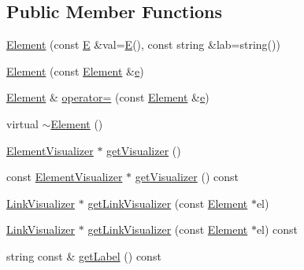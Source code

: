 \subsection*{Public Member Functions}
\begin{DoxyCompactItemize}
\item 
\mbox{\hyperlink{classbridges_1_1_element_abc7131584142ea48faf3b7a8033d1fef}{Element}} (const \mbox{\hyperlink{namespacebridges_acfb0a4f7877d8f63de3e6862004c50eda3a3ea00cfc35332cedf6e5e9a32e94da}{E}} \&val=\mbox{\hyperlink{namespacebridges_acfb0a4f7877d8f63de3e6862004c50eda3a3ea00cfc35332cedf6e5e9a32e94da}{E}}(), const string \&lab=string())
\item 
\mbox{\hyperlink{classbridges_1_1_element_a6dc69b51f85f4e9914434b8c79126057}{Element}} (const \mbox{\hyperlink{classbridges_1_1_element}{Element}} \&\mbox{\hyperlink{namespacebridges_acfb0a4f7877d8f63de3e6862004c50edae1671797c52e15f763380b45e841ec32}{e}})
\item 
\mbox{\hyperlink{classbridges_1_1_element}{Element}} \& \mbox{\hyperlink{classbridges_1_1_element_a0f1b5a5688fe4db68f84969e93cea245}{operator=}} (const \mbox{\hyperlink{classbridges_1_1_element}{Element}} \&\mbox{\hyperlink{namespacebridges_acfb0a4f7877d8f63de3e6862004c50edae1671797c52e15f763380b45e841ec32}{e}})
\item 
virtual \mbox{\hyperlink{classbridges_1_1_element_a1dcdcd8948db683fc109687fe5d9c8e1}{$\sim$\+Element}} ()
\item 
\mbox{\hyperlink{classbridges_1_1_element_visualizer}{Element\+Visualizer}} $\ast$ \mbox{\hyperlink{classbridges_1_1_element_a358f350ae6e33d55c4ac9f9213d0c5bc}{get\+Visualizer}} ()
\item 
const \mbox{\hyperlink{classbridges_1_1_element_visualizer}{Element\+Visualizer}} $\ast$ \mbox{\hyperlink{classbridges_1_1_element_a27d023054130e17234ace34ba35e766e}{get\+Visualizer}} () const
\item 
\mbox{\hyperlink{classbridges_1_1_link_visualizer}{Link\+Visualizer}} $\ast$ \mbox{\hyperlink{classbridges_1_1_element_aa8dd91d04c22c697f7c500a18642282f}{get\+Link\+Visualizer}} (const \mbox{\hyperlink{classbridges_1_1_element}{Element}} $\ast$el)
\item 
\mbox{\hyperlink{classbridges_1_1_link_visualizer}{Link\+Visualizer}} $\ast$ \mbox{\hyperlink{classbridges_1_1_element_a202553f482b9a49057c8c87a368cc93a}{get\+Link\+Visualizer}} (const \mbox{\hyperlink{classbridges_1_1_element}{Element}} $\ast$el) const
\item 
string const  \& \mbox{\hyperlink{classbridges_1_1_element_a4a837ef776c2fd3ecf6587f6e3136351}{get\+Label}} () const

\end{DoxyCompactItemize}
